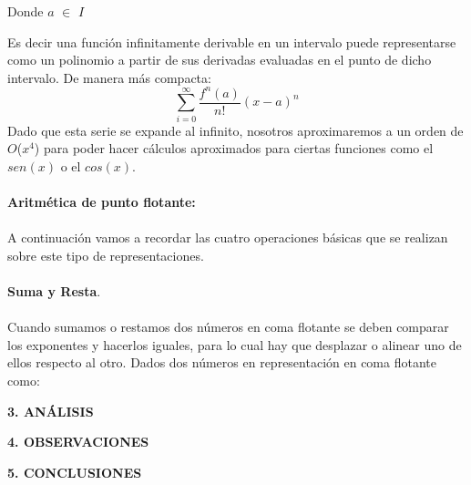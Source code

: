 \documentclass[10pt,a4paper]{article}
\begin{document}
\begin{multicols}{2}
\begin{center}
Donde $a$ $\in$ $I$
\end{center}
Es decir una funci\'on infinitamente derivable en un intervalo puede representarse como un polinomio a partir de sus derivadas evaluadas en el punto  de dicho intervalo. De manera más compacta:\\
\begin{equation}
\sum_{i=0}^\infty\frac{{f}^{n}{(a)}}{n!}{(x-a)^{n}}
\end{equation}
Dado que esta serie se expande al infinito, nosotros aproximaremos a un orden de $O$($x^{4}$) para poder hacer c\'alculos aproximados para ciertas funciones como el $sen(x)$ o el $cos(x)$.\\\\
\textbf{Aritm\'etica de punto flotante:}\\\\
A continuaci\'on vamos a recordar las cuatro operaciones b\'asicas que se realizan sobre este tipo de
representaciones.\\\\
\textbf{Suma y Resta}.\\\\
Cuando sumamos o restamos dos n\'umeros en coma flotante se deben comparar los exponentes y
hacerlos iguales, para lo cual hay que desplazar o alinear uno de ellos respecto al otro. Dados dos
números en representaci\'on en coma flotante como:\\

\begin{center}
{\large \bf 3. AN\'ALISIS}
\end{center}

\begin{center}
{\large \bf 4. OBSERVACIONES}
\end{center}

\begin{center}
{\large \bf 5. CONCLUSIONES}
\end{center}


\end{multicols}
\end{document}
